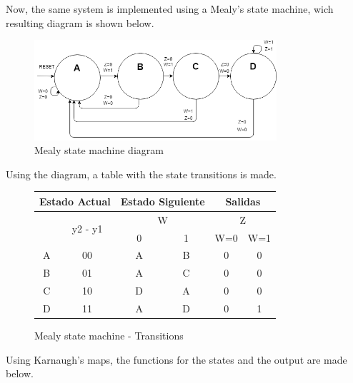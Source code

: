 Now, the same system is implemented using a Mealy's 
state machine, wich resulting diagram is shown below.

\begin{figure}[H]
    \begin{centering}
    \includegraphics[width=0.8\textwidth]{data/Graficos2/2b_fsm.png}
    \par\end{centering}
    \caption{Mealy state machine diagram}
\end{figure}

Using the diagram, a table with the state 
transitions is made.
\begin{figure}[H]
    \begin{center}
\begin{tabular}{|c|c|c|c||c|c|}
    \hline 
    \multicolumn{2}{|c|}{Estado Actual} & \multicolumn{2}{c||}{Estado Siguiente} & \multicolumn{2}{c|}{Salidas}\tabularnewline
    \hline 
    \hline 
    \multirow{2}{*}{} & \multirow{2}{*}{y2 - y1} & \multicolumn{2}{c||}{W} & \multicolumn{2}{c|}{Z}\tabularnewline
    \cline{3-6} 
     &  & \multicolumn{1}{c|}{0} & \multicolumn{1}{c||}{1} & W=0 & W=1\tabularnewline
    \hline 
    A & 00 & A & B & 0 & 0\tabularnewline
    \hline 
    B & 01 & A & C & 0 & 0\tabularnewline
    \hline 
    C & 10 & D & A & 0 & 0\tabularnewline
    \hline 
    D & 11 & A & D & 0 & 1\tabularnewline
    \hline 
    \end{tabular}
    \caption{Mealy state machine - Transitions}
\end{center}
\end{figure}

Using Karnaugh's maps, the functions for the 
states and the output are made below.

